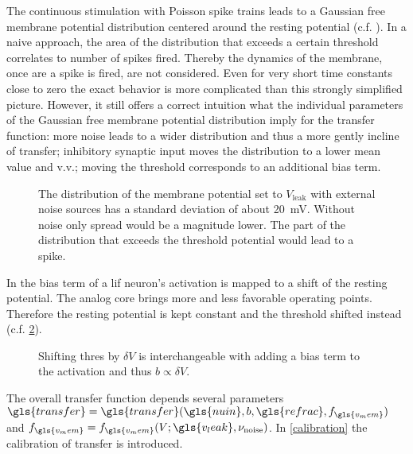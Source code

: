 The continuous stimulation with Poisson spike trains leads to a Gaussian free membrane potential distribution centered around the resting potential (c.f. \cite{mihaiphd}). In a naive approach, the area of the distribution that exceeds a certain threshold correlates to number of spikes fired. Thereby the dynamics of the membrane, once are a spike is fired, are not considered. Even for very short time constants close to zero the exact behavior is more complicated than this strongly simplified picture. However, it still offers a correct intuition what the individual parameters of the Gaussian free membrane potential distribution imply for the transfer function: more noise leads to a wider distribution and thus a more gently incline of \gls{transfer}; inhibitory synaptic input moves the distribution to a lower mean value and v.v.; moving the threshold corresponds to an additional bias term.

\begin{figure}
	\label{vleak_w_noise}
	\begin{center}
		
	\end{center}
	\caption{The distribution of the membrane potential set to $V_{\text{leak}}$ with external noise sources has a standard deviation of about \SI{20}{\milli\V}. Without noise only spread would be a magnitude lower. The part of the distribution that exceeds the threshold potential would lead to a spike.}
\end{figure}

In \cite{petrovici2016stochastic} the bias term of a \gls{lif} neuron's activation is mapped to a shift of the resting potential. The analog core brings more and less favorable operating points. Therefore the resting potential is kept constant and the threshold shifted instead (c.f. \cref{transferfunction_with_bias}).

\begin{figure}
	\label{transferfunction_with_bias}
	\begin{center}
		
	\end{center}
	\caption{Shifting \gls{thres} by $\delta V$ is interchangeable with adding a bias term to the activation and thus $b \propto \delta V$.}
\end{figure}

The overall transfer function depends several parameters $\gls{transfer} = \gls{transfer}(\gls{nuin}, b, \gls{refrac}, f_{\gls{v_mem}})$ and $f_{\gls{v_mem}} = f_{\gls{v_mem}}(V; \gls{v_leak}, \nu_\text{noise})$. In \cref{calibration} the calibration of \gls{transfer} is introduced.

